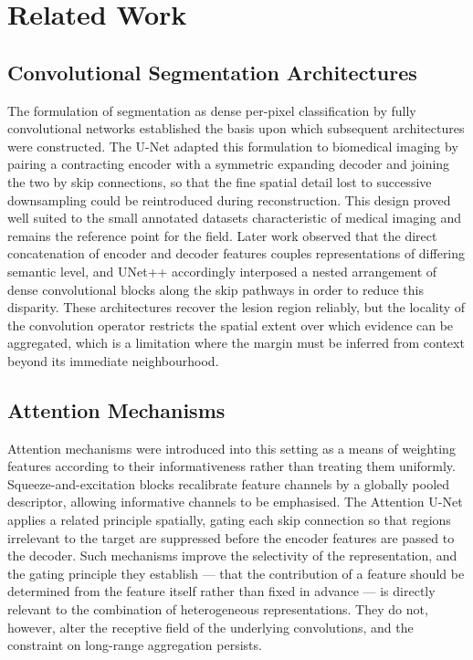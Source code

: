 \section{Related Work}
\label{sec:related}

\subsection{Convolutional Segmentation Architectures}

The formulation of segmentation as dense per-pixel classification by fully convolutional networks \cite{ref16} established the basis upon which subsequent architectures were constructed. The U-Net \cite{ref4} adapted this formulation to biomedical imaging by pairing a contracting encoder with a symmetric expanding decoder and joining the two by skip connections, so that the fine spatial detail lost to successive downsampling could be reintroduced during reconstruction. This design proved well suited to the small annotated datasets characteristic of medical imaging and remains the reference point for the field. Later work observed that the direct concatenation of encoder and decoder features couples representations of differing semantic level, and UNet++ \cite{ref6} accordingly interposed a nested arrangement of dense convolutional blocks along the skip pathways in order to reduce this disparity. These architectures recover the lesion region reliably, but the locality of the convolution operator restricts the spatial extent over which evidence can be aggregated, which is a limitation where the margin must be inferred from context beyond its immediate neighbourhood.

\subsection{Attention Mechanisms}

Attention mechanisms were introduced into this setting as a means of weighting features according to their informativeness rather than treating them uniformly. Squeeze-and-excitation blocks \cite{ref17} recalibrate feature channels by a globally pooled descriptor, allowing informative channels to be emphasised. The Attention U-Net \cite{ref5} applies a related principle spatially, gating each skip connection so that regions irrelevant to the target are suppressed before the encoder features are passed to the decoder. Such mechanisms improve the selectivity of the representation, and the gating principle they establish --- that the contribution of a feature should be determined from the feature itself rather than fixed in advance --- is directly relevant to the combination of heterogeneous representations. They do not, however, alter the receptive field of the underlying convolutions, and the constraint on long-range aggregation persists.

